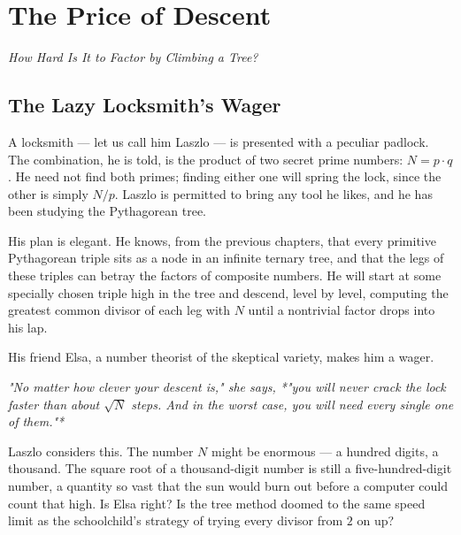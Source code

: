 \documentclass[11pt,openright,twoside]{book}
\renewenvironment{quotation}{%
  \par\vspace{8pt}%
  \begin{list}{}{%
    \setlength{\leftmargin}{2em}%
    \setlength{\rightmargin}{2em}%
  }\item[]\itshape\color{pullquote}%
}{%
  \end{list}%
  \par\vspace{8pt}%
}
\theoremstyle{definition}
\begin{document}
\clearpage


\chapter{The Price of Descent}
\label{ch:8}

\begin{center}
\textit{How Hard Is It to Factor by Climbing a Tree?}
\end{center}
\bigskip




\bigskip


\section{The Lazy Locksmith's Wager}

A locksmith --- let us call him Laszlo --- is presented with a peculiar padlock. The combination, he is told, is the product of two secret prime numbers: $N = p \cdot q$. He need not find both primes; finding either one will spring the lock, since the other is simply $N / p$. Laszlo is permitted to bring any tool he likes, and he has been studying the Pythagorean tree.

His plan is elegant. He knows, from the previous chapters, that every primitive Pythagorean triple sits as a node in an infinite ternary tree, and that the legs of these triples can betray the factors of composite numbers. He will start at some specially chosen triple high in the tree and descend, level by level, computing the greatest common divisor of each leg with $N$ until a nontrivial factor drops into his lap.

His friend Elsa, a number theorist of the skeptical variety, makes him a wager.

\begin{quotation}
\noindent\itshape \textit{"No matter how clever your descent is,"} she says, *"you will never crack the lock faster than about $\sqrt{N}$ steps. And in the worst case, you will need every single one of them."*
\end{quotation}

Laszlo considers this. The number $N$ might be enormous --- a hundred digits, a thousand. The square root of a thousand-digit number is still a five-hundred-digit number, a quantity so vast that the sun would burn out before a computer could count that high. Is Elsa right? Is the tree method doomed to the same speed limit as the schoolchild's strategy of trying every divisor from $2$ on up?
\end{document}

